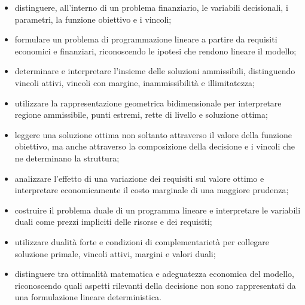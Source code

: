\begin{itemize}

\item distinguere, all'interno di un problema finanziario, le variabili
decisionali, i parametri, la funzione obiettivo e i vincoli;

\item formulare un problema di programmazione lineare a partire da requisiti
economici e finanziari, riconoscendo le ipotesi che rendono lineare il
modello;

\item determinare e interpretare l'insieme delle soluzioni ammissibili,
distinguendo vincoli attivi, vincoli con margine, inammissibilit\`a e
illimitatezza;

\item utilizzare la rappresentazione geometrica bidimensionale per
interpretare regione ammissibile, punti estremi, rette di livello e
soluzione ottima;

\item leggere una soluzione ottima non soltanto attraverso il valore della
funzione obiettivo, ma anche attraverso la composizione della decisione e i
vincoli che ne determinano la struttura;

\item analizzare l'effetto di una variazione dei requisiti sul valore ottimo e
interpretare economicamente il costo marginale di una maggiore prudenza;

\item costruire il problema duale di un programma lineare e interpretare le
variabili duali come prezzi impliciti delle risorse e dei requisiti;

\item utilizzare dualit\`a forte e condizioni di complementariet\`a per
collegare soluzione primale, vincoli attivi, margini e valori duali;

\item distinguere tra ottimalit\`a matematica e adeguatezza economica del
modello, riconoscendo quali aspetti rilevanti della decisione non sono
rappresentati da una formulazione lineare deterministica.

\end{itemize}


